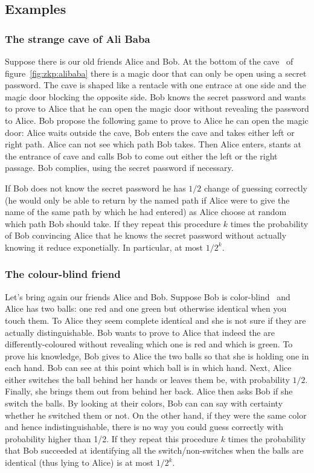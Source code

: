 \subsection{Examples}

\subsubsection{The strange cave of Ali Baba}
\label{zkp:examples}

Suppose there is our old friends Alice and Bob. At the bottom of the cave~\cite{Quisquater:1989:EZP:118209.118269} of figure~\ref{fig:zkp:alibaba} there is a magic door that
can only be open using a secret password. The cave is shaped like a rentacle with one entrace at one side and the magic door blocking the opposite side.
Bob knows the secret password and wants to prove to Alice that he can open the magic door without revealing the password to Alice.
Bob propose the following game to prove to Alice he can open the magic door: Alice waits outside the cave, Bob enters the cave and
takes either left or right path. Alice can not see which path Bob takes. Then Alice enters, stants at the entrance of cave and calls
Bob to come out either the left or the right passage. Bob complies, using the secret password if necessary.

If Bob does not know the secret password he has $1/2$ change of guessing correctly (he would only be able to return by the named path if
Alice were to give the name of the same path by which he had entered) as Alice choose at random which path Bob should take. If they repeat this procedure
$k$ times the probability of Bob convincing Alice that he knows the secret password without actually knowing it reduce exponetially. In particular, at most $1/2^{k}$.

\subsubsection{The colour-blind friend}

Let's bring again our friends Alice and Bob. Suppose Bob is color-blind~\cite{zkp:colour_blind} and Alice has two balls: one red and one green but otherwise identical when you touch them.
To Alice they seem complete identical and she is not sure if they are actually distinguishable. Bob wants to prove to Alice that indeed the are differently-coloured
without revealing which one is red and which is green. To prove his knowledge, Bob gives to Alice the two balls so that she is holding one in each hand. Bob can see
at this point which ball is in which hand. Next, Alice either switches the ball behind her hands or leaves them be, with probability $1/2$. Finally, she brings
them out from behind her back. Alice then asks Bob if she switch the balls. By looking at their colors, Bob can can say with certainty whether he switched them or not.
On the other hand, if they were the same color and hence indistinguishable, there is no way you could guess correctly with probability higher than 1/2. If they repeat
this procedure $k$ times the probability that Bob succeeded at identifying all the switch/non-switches when the balls are identical (thus lying to Alice) is at most
$1/2^{k}$.

